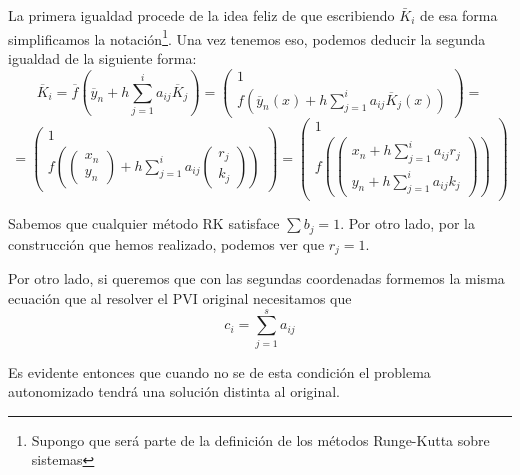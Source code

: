 \begin{problem}
\obs La primera igualdad procede de la idea feliz de que escribiendo $\bar{K}_i$ de esa forma simplificamos la notación\footnote{Supongo que será parte de la definición de los métodos Runge-Kutta sobre sistemas}. Una vez tenemos eso, podemos deducir la segunda igualdad de la siguiente forma:
\[\overline{K}_i = \overline{f}\left(\overline{y}_n+h\sum_{j=1}^ia_{ij}\overline{K}_j\right) = \left(\begin{array}{c} 1 \\ f(\overline{y}_n(x)+h\sum_{j=1}^ia_{ij}\overline{K}_j(x))  \end{array} \right) =\]
\[= \left(\begin{array}{c} 1 \\ f\left(\left(\begin{array}{c} x_n \\ y_n\end{array}\right)+h\sum_{j=1}^ia_{ij}\left(\begin{array}{c} r_j \\ k_j\end{array}\right)\right)  \end{array} \right) = \left(\begin{array}{c} 1 \\ f\left(\left(\begin{array}{c} x_n + h\sum_{j=1}^ia_{ij}r_j \\ y_n + h \sum_{j=1}^ia_{ij}k_j\end{array}\right)\right)  \end{array} \right)\]

Sabemos que cualquier método RK satisface $\sum b_j=1$. Por otro lado, por la construcción que hemos realizado, podemos ver que $r_j=1$.

Por otro lado, si queremos que con las segundas coordenadas formemos la misma ecuación que al resolver el PVI original necesitamos que
\[c_i = \sum_{j=1}^s a_{ij}\]

Es evidente entonces que cuando no se de esta condición el problema autonomizado tendrá una solución distinta al original.


\end{problem}

